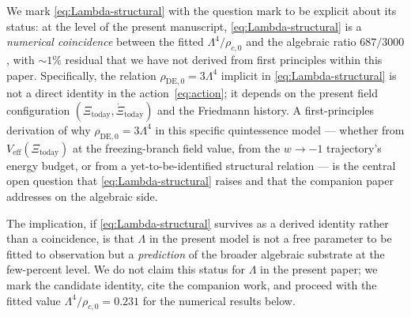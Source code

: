 We mark \eqref{eq:Lambda-structural} with the question mark to be
explicit about its status: at the level of the present manuscript,
\eqref{eq:Lambda-structural} is a \emph{numerical coincidence}
between the fitted $\Lambda^{4}/\rho_{c,0}$ and the algebraic
ratio $687/3000$, with $\sim 1\%$ residual that we have not
derived from first principles within this paper. Specifically,
the relation $\rho_{\mathrm{DE},0} = 3 \Lambda^{4}$ implicit in
\eqref{eq:Lambda-structural} is not a direct identity in the
action~\eqref{eq:action}; it depends on the present field
configuration $(\Xi_\mathrm{today}, \dot\Xi_\mathrm{today})$ and
the Friedmann history. A first-principles derivation of why
$\rho_{\mathrm{DE},0} = 3 \Lambda^{4}$ in this specific
quintessence model --- whether from
$V_\mathrm{eff}(\Xi_\mathrm{today})$ at the freezing-branch
field value, from the $w \to -1$ trajectory's energy budget, or
from a yet-to-be-identified structural relation --- is the
central open question that \eqref{eq:Lambda-structural} raises
and that the companion paper~\cite{Sprint18Cosmology2026}
addresses on the algebraic side.

The implication, if \eqref{eq:Lambda-structural} survives as a
derived identity rather than a coincidence, is that
$\Lambda$ in the present model is not a free parameter to be
fitted to observation but a \emph{prediction} of the broader
algebraic substrate at the few-percent level. We do not claim
this status for $\Lambda$ in the present paper; we mark the
candidate identity, cite the companion work, and proceed with
the fitted value $\Lambda^{4}/\rho_{c,0} = 0.231$ for
the numerical results below.


